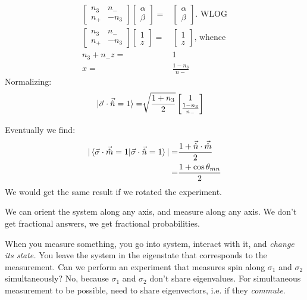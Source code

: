 \documentclass[]{article}
\begin{document}
\begin{align*}
	\begin{bmatrix}
		n_3 &n_-\\
		n_+&-n_3
	\end{bmatrix}\begin{bmatrix}
		\alpha\\
		\beta
	\end{bmatrix}=&\begin{bmatrix}
		\alpha\\
		\beta
\end{bmatrix} \text{. WLOG}\\
	\begin{bmatrix}
	n_3 &n_-\\
	n_+&-n_3
\end{bmatrix}\begin{bmatrix}
	1\\
	z
\end{bmatrix}=&\begin{bmatrix}
	1\\
	z
\end{bmatrix} \text{, whence}\\
n_3 + n_- z =& 1\\
x =& \frac{1-n_3}{n-}
\end{align*}
 Normalizing:
 \begin{align*}
 	\ket{\vec{\sigma} \cdot \vec{\hat{n}}=1} =& \sqrt{\frac{1+n_3}{2}} \begin{bmatrix}
 		1\\\frac{1-n_3}{n_-}
 	\end{bmatrix}
 \end{align*}

Eventually we find:
\begin{align*}
	\vert \braket{\vec{\sigma} \cdot \vec{\hat{m}}=1\vert\vec{\sigma} \cdot \vec{\hat{n}}=1}\vert =& \frac{1 + \vec{\hat{n}} \cdot \vec{\hat{m}}}{2}\\
	=& \frac{1 + \cos{\theta_{mn}}}{2}
\end{align*}
We would get the same result if we rotated the experiment.

We can orient the system along any axis, and measure along any axis. We don't get fractional answers, we get fractional probabilities.

When you measure something, you go into system, interact with it, and \emph{change its state.} You leave the system in the eigenstate that corresponds to the measurement. Can we perform an experiment that measures spin along $\sigma_1$ and $\sigma_2$ simultaneously? No, because $\sigma_1$ and $\sigma_2$ don't share eigenvalues. For simultaneous measurement to be possible, need to share eigenvectors, i.e. if they \emph{commute}.
\end{document}
